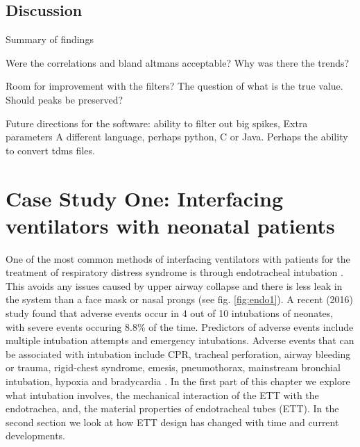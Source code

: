 \documentclass[12pt, openany, oneside]{book}
\begin{document}
\section{Discussion}
Summary of findings

Were the correlations and bland altmans acceptable? Why was there the trends?

Room for improvement with the filters? The question of what is the true value. Should peaks be preserved?

Future directions for the software:
ability to filter out big spikes,
Extra parameters
A different language, perhaps python, C or Java. Perhaps the ability to convert tdms files.







\chapter{Case Study One: Interfacing ventilators with neonatal patients }

One of the most common methods of interfacing ventilators with patients for the treatment of respiratory distress syndrome is through endotracheal intubation \citep{strong1977endotracheal}. This avoids any issues caused by upper airway collapse and there is less leak in the system than a face mask or nasal prongs (see fig. \ref{fig:endo1}). A recent (2016) study found that adverse events occur in 4 out of 10 intubations of neonates, with severe events occuring 8.8{\%} of the time. Predictors of adverse events include multiple intubation attempts and emergency intubations. Adverse events that can be associated with intubation include CPR, tracheal perforation, airway bleeding or trauma, rigid-chest syndrome, emesis, pneumothorax, mainstream bronchial intubation, hypoxia and bradycardia \cite{hatch2016endotracheal}. In the first part of this chapter we explore what intubation involves, the mechanical interaction of the ETT with the endotrachea, and, the material properties of endotracheal tubes (ETT). In the second section we look at how ETT design has changed with time and current developments. \\
\end{document}
